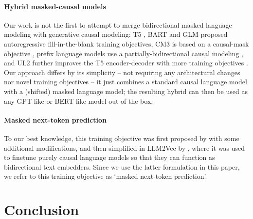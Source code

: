 \paragraph{Hybrid masked-causal models} Our work is not the first to attempt to merge bidirectional masked language modeling with generative causal modeling: T5 \citep{10.5555/3455716.3455856}, BART \citep{lewis-etal-2020-bart} and GLM \citep{du-etal-2022-glm} proposed autoregressive fill-in-the-blank training objectives, CM3 is based on a causal-mask objective \citep{aghajanyan2022cm3}, prefix language models use a partially-bidirectional causal modeling \citep{NEURIPS2019_c20bb2d9, 10.5555/3455716.3455856}, and UL2 further improves the T5 encoder-decoder with more training objectives \citep{tay2023ul}. Our approach differs by its simplicity -- not requiring any architectural changes nor novel training objectives -- it just combines a standard causal language model with a (shifted) masked language model; the resulting hybrid can then be used as any GPT-like or BERT-like model out-of-the-box.

\paragraph{Masked next-token prediction} To our best knowledge, this training objective was first proposed by  with some additional modifications, and then simplified in LLM2Vec by , where it was used to finetune purely causal language models so that they can function as bidirectional text embedders. Since we use the latter formulation in this paper, we refer to this training objective as `masked next-token prediction'.

\section{Conclusion}
\label{sec:conclusion}

